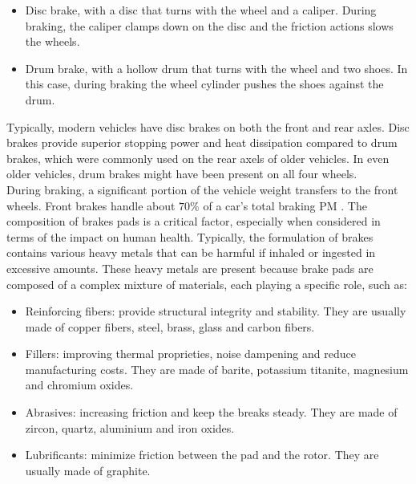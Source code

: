 \begin{itemize}
    \item Disc brake, with a disc that turns with the wheel and a caliper. During braking, the caliper clamps down on the disc and the friction actions slows the wheels.
    \item Drum brake, with a hollow drum that turns with the wheel and two shoes. In this case, during braking the wheel cylinder pushes the shoes against the drum.  
\end{itemize}
Typically, modern vehicles have disc brakes on both the front and rear axles. Disc brakes provide superior stopping power and heat dissipation compared to drum brakes, which were commonly used on the rear axels of older vehicles. In even older vehicles, drum brakes might have been present on all four wheels. \\

During braking, a significant portion of the vehicle weight transfers to the front wheels. Front brakes handle about $70\%$ of a car’s total braking PM \cite{grigoratos2015brake}.
The composition of brakes pads is a critical factor, especially when considered in terms of the impact on human health. Typically, the formulation of brakes contains various heavy metals that can be harmful if inhaled or ingested in excessive amounts.
These heavy metals are present because brake pads are composed of a complex mixture of materials, each playing a specific role, such as:
\begin{itemize}
    \item Reinforcing fibers: provide structural integrity and stability. They are usually made of copper fibers, steel, brass, glass and carbon fibers.
    \item Fillers: improving thermal proprieties, noise dampening and reduce manufacturing costs. They are made of barite, potassium titanite, magnesium and chromium oxides.
    \item Abrasives: increasing friction and keep the breaks steady. They are made of zircon, quartz, aluminium and iron oxides.
    \item Lubrificants: minimize friction between the pad and the rotor. They are usually made of graphite.
\end{itemize}

